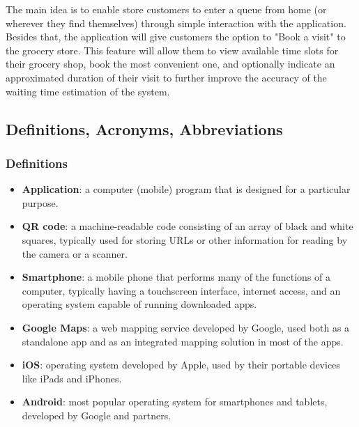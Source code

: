 The main idea is to enable store customers to enter a queue from home (or wherever they find themselves) through simple interaction with the application. Besides that, the application will give customers the option to "Book a visit" to the grocery store. This feature will allow them to view available time slots for their grocery shop, book the most convenient one, and optionally indicate an approximated duration of their visit to further improve the accuracy of the waiting time estimation of the system.  

\newpage

\subsection{Definitions, Acronyms, Abbreviations}
\subsubsection{Definitions}
\begin{itemize} 
	\item \textbf{Application}: a computer (mobile) program that is designed for a particular purpose. 
	\item \textbf{QR code}: a machine-readable code consisting of an array of black and white squares, typically used for storing URLs or other information for reading by the camera or a scanner. 
	\item \textbf{Smartphone}: a mobile phone that performs many of the functions of a computer, typically having a touchscreen interface, internet access, and an operating system capable of running downloaded apps. 
	\item \textbf{Google Maps}: a web mapping service developed by Google, used both as a standalone app and as an integrated mapping solution in most of the apps.
	\item \textbf{iOS}: operating system developed by Apple, used by their portable devices like iPads and iPhones.
	\item \textbf{Android}: most popular operating system for smartphones and tablets, developed by Google and partners.
\end{itemize}
